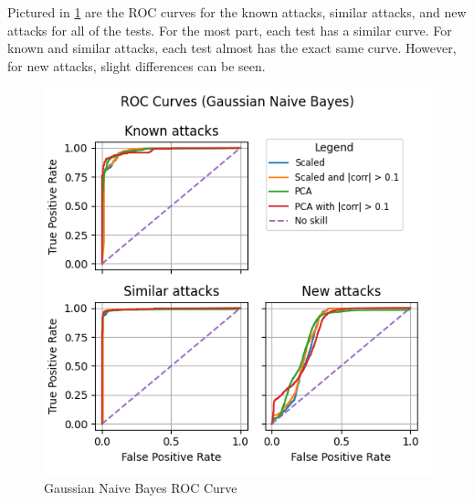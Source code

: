 Pictured in \ref{fig:gaus_roc} are the ROC curves for the known attacks, similar attacks, and new attacks for all of the tests. For the most part, each test has a similar curve. For known and similar attacks, each test almost has the exact same curve. However, for new attacks, slight differences can be seen.
\begin{figure}
    \centering
    \includegraphics[width=\linewidth]{figures/Gaussian Naive Bayes_roc_all_small.png}
    \caption{Gaussian Naive Bayes ROC Curve}
    \label{fig:gaus_roc}
\end{figure}



